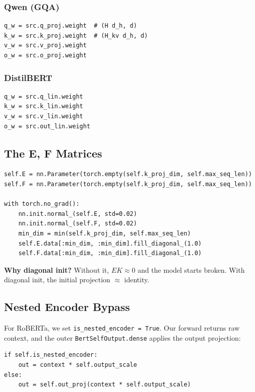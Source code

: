 \subsubsection{Qwen (GQA)}

\begin{lstlisting}
q_w = src.q_proj.weight  # (H d_h, d)
k_w = src.k_proj.weight  # (H_kv d_h, d)
v_w = src.v_proj.weight
o_w = src.o_proj.weight
\end{lstlisting}

\subsubsection{DistilBERT}

\begin{lstlisting}
q_w = src.q_lin.weight
k_w = src.k_lin.weight
v_w = src.v_lin.weight
o_w = src.out_lin.weight
\end{lstlisting}

\subsection{The E, F Matrices}

\begin{lstlisting}
self.E = nn.Parameter(torch.empty(self.k_proj_dim, self.max_seq_len))
self.F = nn.Parameter(torch.empty(self.k_proj_dim, self.max_seq_len))

with torch.no_grad():
    nn.init.normal_(self.E, std=0.02)
    nn.init.normal_(self.F, std=0.02)
    min_dim = min(self.k_proj_dim, self.max_seq_len)
    self.E.data[:min_dim, :min_dim].fill_diagonal_(1.0)
    self.F.data[:min_dim, :min_dim].fill_diagonal_(1.0)
\end{lstlisting}

\textbf{Why diagonal init?} Without it, $E K \approx 0$ and the model starts 
broken. With diagonal init, the initial projection $\approx$ identity.

\subsection{Nested Encoder Bypass}

For RoBERTa, we set \texttt{is\_nested\_encoder = True}. Our forward returns raw 
context, and the outer \texttt{BertSelfOutput.dense} applies the output projection:

\begin{lstlisting}
if self.is_nested_encoder:
    out = context * self.output_scale
else:
    out = self.out_proj(context * self.output_scale)
\end{lstlisting}

